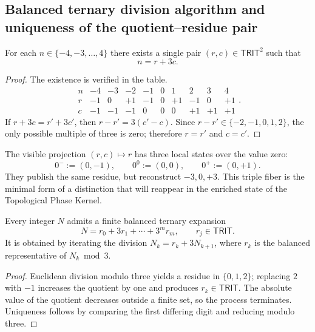 \subsection{Balanced ternary division algorithm and uniqueness of the quotient–residue pair}

\begin{theorem}
\label{p12-83-c1-s11:thm:trit-levantamiento-local}
For each \(n\in\{-4,-3,\ldots,4\}\) there exists a single pair
\((r,c)\in\mathsf{TRIT}^2\) such that
\[
 n=r+3c.
\]
\end{theorem}

\begin{proof}
The existence is verified in the table.
\[
\begin{array}{c|rrrrrrrrr}
n&-4&-3&-2&-1&0&1&2&3&4\\\hline
r&-1&0&+1&-1&0&+1&-1&0&+1\\
c&-1&-1&-1&0&0&0&+1&+1&+1
\end{array}.
\]
If \(r+3c=r'+3c'\), then \(r-r'=3(c'-c)\). Since
\(r-r'\in\{-2,-1,0,1,2\}\), the only possible multiple of three is zero;
therefore \(r=r'\) and \(c=c'\).
\end{proof}

The visible projection \((r,c)\mapsto r\) has three local states over the value zero:
\[
 0^-:=(0,-1),
 \qquad
 0^0:=(0,0),
 \qquad
 0^+:=(0,+1).
\]
They publish the same residue, but reconstruct \(-3,0,+3\). This triple fiber
is the minimal form of a distinction that will reappear in the enriched state
of the Topological Phase Kernel.

\begin{corollary}
\label{p12-83-c1-s11:cor:trit-iteracion-balanceada}
Every integer \(N\) admits a finite balanced ternary expansion
\[
 N=r_0+3r_1+\cdots+3^mr_m,
 \qquad r_j\in\mathsf{TRIT}.
\]
It is obtained by iterating the division \(N_k=r_k+3N_{k+1}\), where \(r_k\) is the
balanced representative of \(N_k\bmod3\).
\end{corollary}

\begin{proof}
Euclidean division modulo three yields a residue in \(\{0,1,2\}\); replacing \(2\) with \(-1\) increases the quotient by one and produces \(r_k\in\mathsf{TRIT}\). The absolute value of the quotient decreases outside a finite set, so the process terminates. Uniqueness follows by comparing the first differing digit and reducing modulo three.
\end{proof}

